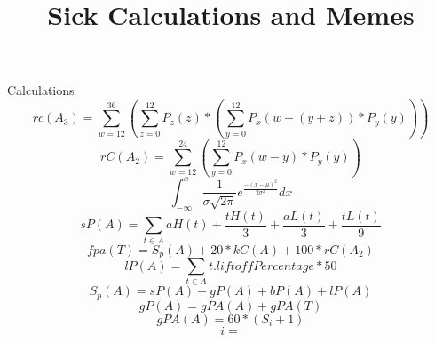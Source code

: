 \documentclass{article}
\title{Sick Calculations and Memes}
\begin{document}
   \maketitle
   Calculations
 	$$rc(A_3) = \sum_{w=12}^{36} (\sum_{z=0}^{12} P_z(z) * (\sum_{y=0}^{12} P_x(w-(y+z)) * P_y(y)))$$
 	$$rC(A_2) = \sum_{w=12}^{24} (\sum_{y=0}^{12} P_x(w-y) * P_y(y))$$
 	$$\int_{-\infty}^{x} \frac{1}{\sigma\sqrt{2\pi}} e^{\frac{-(x - \mu)^2}{2\sigma^2}} dx$$	
 	$$sP(A) = \sum_{t \in A}^{} aH(t) + \frac{tH(t)}{3} + \frac{aL(t)}{3} + \frac{tL(t)}{9}$$
 	$$fpa(T) = S_p(A) + 20 * kC(A) + 100 * rC(A_2)$$
 	$$lP(A) = \sum_{t \in A}{} t.liftoffPercentage * 50$$
 	$$S_p(A) = sP(A) + gP(A) + bP(A) + lP(A)$$
 	$$gP(A) = gPA(A) + gPA(T)$$
 	$$gPA(A) = 60 * (S_i + 1)$$
 	$$i = $$ 
\end{document}
